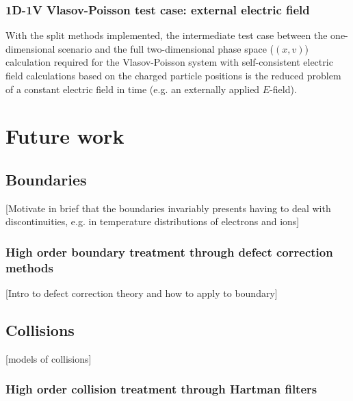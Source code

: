 \documentclass[11pt,titlepage]{report}
\begin{document}
\subsection{1D-1V Vlasov-Poisson test case: external electric field}

\indent\indent With the split methods implemented, the intermediate test case between the one-dimensional scenario and the full two-dimensional phase space ($(x,v)$) calculation required for the Vlasov-Poisson system with self-consistent electric field calculations based on the charged particle positions is the reduced problem of a constant electric field in time (e.g. an externally applied $E$-field).





\chapter{Future work}\label{chap:Future_work}


\section{Boundaries}

[Motivate in brief that the boundaries invariably presents having to deal with discontinuities, e.g. in temperature distributions of electrons and ions]

\subsection{High order boundary treatment through defect correction methods}

[Intro to defect correction theory and how to apply to boundary]

\section{Collisions}

[models of collisions]

\subsection{High order collision treatment through Hartman filters}
\end{document}
